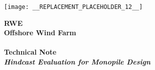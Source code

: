 \vspace*{1cm}

\begin{centering}
\texttt{[image: \_\_REPLACEMENT\_PLACEHOLDER\_12\_\_]} \\%
\end{centering}

\hspace{3.6cm}
\begin{minipage}{\textwidth}
\vspace{2cm}

\fontsize{14}{20}\selectfont \textbf{RWE} \\
\fontsize{20}{25}\selectfont \textbf{Offshore Wind Farm} \\
\\
\fontsize{18}{25}\selectfont \textbf{Technical Note} \\
\textcolor{JBOGreen}{\fontsize{16}{14.4}\selectfont \textit{\textbf{Hindcast Evaluation for Monopile \newline Design}}}
\end{minipage}



